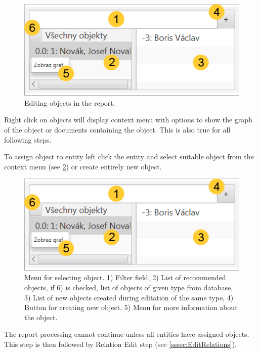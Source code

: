 \documentclass[12pt,a4paper]{report}
\begin{document}
\begin{figure}[!htb]
        \centering
        \includegraphics[width=\textwidth]{Images/objects}
        \caption{Editing objects in the report.}
        \label{fig:Objects}
\end{figure}

Right click on objects will display context menu with options to show the graph
of the object or documents containing the object. This is also true for all following steps.

To assign object to entity left click the entity and select suitable object
from the context menu (see \ref{fig:ObjectMenu}) or create entirely new object.

\begin{figure}[!htb]
        \centering
        \includegraphics[width=\textwidth]{Images/objectmenu}
        \caption{Menu for selecting object. 1) Filter field, 2) List of recommended objects, if 6) is checked, list of objects of given type from database, 3) List of new objects created during editation of the same type, 4) Button for creating new object, 5) Menu for more information about the object.}
        \label{fig:ObjectMenu}
\end{figure}


The report processing cannot continue unless all entities have assigned
objects. This step is then followed by Relation Edit step (see
\ref{sssec:EditRelations}).
\end{document}
